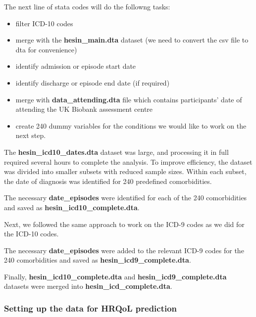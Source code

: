 \documentclass[11pt]{article}
\newcounter{subsubsubsection}[subsubsection]
\begin{document}
The next line of stata codes will do the followng tasks:
\begin{itemize}
\item filter ICD-10 codes
\item merge with the \textbf{hesin\_main.dta} dataset (we need to convert the csv file to dta for convenience)
\item identify admission or episode start date 
\item identify discharge or episode end date (if required)
\item merge with \textbf{data\_attending.dta} file which contains participants' date of attending the UK Biobank assessment centre
\item create 240 dummy variables for the conditions we would like to work on the next step. 
\end{itemize}
\color{violet}
\begin{stlog}\end{stlog}
\color{black}
The \textbf{hesin\_icd10\_dates.dta} dataset was large, and processing it in full required several hours to complete the analysis. To improve efficiency, the dataset was divided into smaller subsets with reduced sample sizes. Within each subset, the date of diagnosis was identified for 240 predefined comorbidities.

\color{violet}
\begin{stlog}\end{stlog}
\color{black}
The necessary \textbf{date\_episodes} were identified for each of the 240 comorbidities and saved as \textbf{hesin\_icd10\_complete.dta}.

Next, we followed the same approach to work on the ICD-9 codes as we did for the ICD-10 codes. 
\color{violet}
\begin{stlog}\end{stlog}
\color{black}
The necessary \textbf{date\_episodes} were added to the relevant ICD-9 codes for the 240 comorbidities and saved as \textbf{hesin\_icd9\_complete.dta}.

Finally, \textbf{hesin\_icd10\_complete.dta} and \textbf{hesin\_icd9\_complete.dta} datasets were merged into \textbf{hesin\_icd\_complete.dta}.
\color{violet}
\begin{stlog}\end{stlog}
\color{black}
\subsubsection{Setting up the data for HRQoL prediction}
\end{document}

